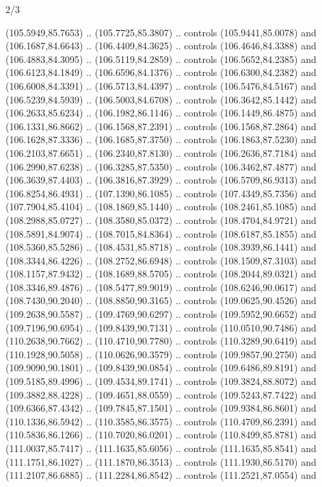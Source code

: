 \begin{flagdescription}{2/3}
\begin{scope}[shift={(0.5\flaglength,0.5)},scale=\flagwidth/320]
\begin{scope}[y=0.8pt, x=0.8pt, yscale=-1,shift={(-118.3,-146)}]
  (105.5949,85.7653) .. (105.7725,85.3807) .. controls (105.9441,85.0078) and
  (106.1687,84.6643) .. (106.4409,84.3625) .. controls (106.4646,84.3388) and
  (106.4883,84.3095) .. (106.5119,84.2859) .. controls (106.5652,84.2385) and
  (106.6123,84.1849) .. (106.6596,84.1376) .. controls (106.6300,84.2382) and
  (106.6008,84.3391) .. (106.5713,84.4397) .. controls (106.5476,84.5167) and
  (106.5239,84.5939) .. (106.5003,84.6708) .. controls (106.3642,85.1442) and
  (106.2633,85.6234) .. (106.1982,86.1146) .. controls (106.1449,86.4875) and
  (106.1331,86.8662) .. (106.1568,87.2391) .. controls (106.1568,87.2864) and
  (106.1628,87.3336) .. (106.1685,87.3750) .. controls (106.1863,87.5230) and
  (106.2103,87.6651) .. (106.2340,87.8130) .. controls (106.2636,87.7184) and
  (106.2990,87.6238) .. (106.3285,87.5350) .. controls (106.3462,87.4877) and
  (106.3639,87.4403) .. (106.3816,87.3929) .. controls (106.5709,86.9313) and
  (106.8254,86.4931) .. (107.1390,86.1085) .. controls (107.4349,85.7356) and
  (107.7904,85.4104) .. (108.1869,85.1440) .. controls (108.2461,85.1085) and
  (108.2988,85.0727) .. (108.3580,85.0372) .. controls (108.4704,84.9721) and
  (108.5891,84.9074) .. (108.7015,84.8364) .. controls (108.6187,85.1855) and
  (108.5360,85.5286) .. (108.4531,85.8718) .. controls (108.3939,86.1441) and
  (108.3344,86.4226) .. (108.2752,86.6948) .. controls (108.1509,87.3103) and
  (108.1157,87.9432) .. (108.1689,88.5705) .. controls (108.2044,89.0321) and
  (108.3346,89.4876) .. (108.5477,89.9019) .. controls (108.6246,90.0617) and
  (108.7430,90.2040) .. (108.8850,90.3165) .. controls (109.0625,90.4526) and
  (109.2638,90.5587) .. (109.4769,90.6297) .. controls (109.5952,90.6652) and
  (109.7196,90.6954) .. (109.8439,90.7131) .. controls (110.0510,90.7486) and
  (110.2638,90.7662) .. (110.4710,90.7780) .. controls (110.3289,90.6419) and
  (110.1928,90.5058) .. (110.0626,90.3579) .. controls (109.9857,90.2750) and
  (109.9090,90.1801) .. (109.8439,90.0854) .. controls (109.6486,89.8191) and
  (109.5185,89.4996) .. (109.4534,89.1741) .. controls (109.3824,88.8072) and
  (109.3882,88.4228) .. (109.4651,88.0559) .. controls (109.5243,87.7422) and
  (109.6366,87.4342) .. (109.7845,87.1501) .. controls (109.9384,86.8601) and
  (110.1336,86.5942) .. (110.3585,86.3575) .. controls (110.4709,86.2391) and
  (110.5836,86.1266) .. (110.7020,86.0201) .. controls (110.8499,85.8781) and
  (111.0037,85.7417) .. (111.1635,85.6056) .. controls (111.1635,85.8541) and
  (111.1751,86.1027) .. (111.1870,86.3513) .. controls (111.1930,86.5170) and
  (111.2107,86.6885) .. (111.2284,86.8542) .. controls (111.2521,87.0554) and

\end{scope}
\end{scope}
\end{flagdescription}
